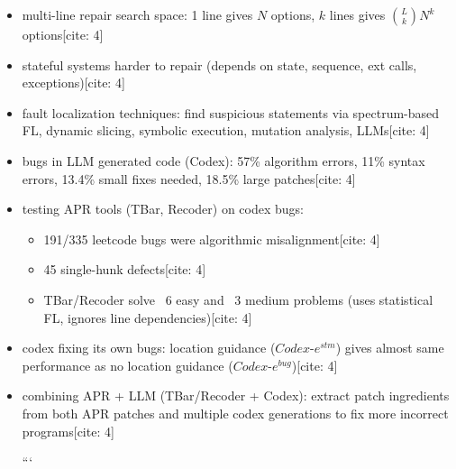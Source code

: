 \begin{itemize}
\item multi-line repair search space: 1 line gives $N$ options, $k$ lines gives $\binom{L}{k}N^k$ options[cite: 4]

\item stateful systems harder to repair (depends on state, sequence, ext calls, exceptions)[cite: 4]

\item fault localization techniques: find suspicious statements via spectrum-based FL, dynamic slicing, symbolic execution, mutation analysis, LLMs[cite: 4]

\item bugs in LLM generated code (Codex): 57\% algorithm errors, 11\% syntax errors, 13.4\% small fixes needed, 18.5\% large patches[cite: 4]

\item testing APR tools (TBar, Recoder) on codex bugs:
\begin{itemize}
    \item 191/335 leetcode bugs were algorithmic misalignment[cite: 4]
    \item 45 single-hunk defects[cite: 4]
    \item TBar/Recoder solve ~6 easy and ~3 medium problems (uses statistical FL, ignores line dependencies)[cite: 4]
\end{itemize}

\item codex fixing its own bugs: location guidance ($Codex\text{-}e^{stm}$) gives almost same performance as no location guidance ($Codex\text{-}e^{bug}$)[cite: 4]

\item combining APR + LLM (TBar/Recoder + Codex): extract patch ingredients from both APR patches and multiple codex generations to fix more incorrect programs[cite: 4]

```

\end{itemize}

